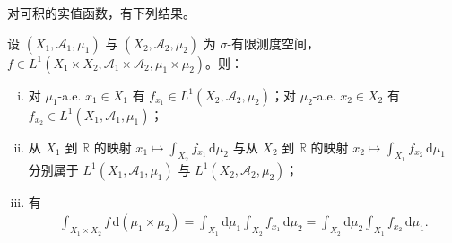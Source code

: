 \documentclass[../../main.tex]{subfiles}%
\begin{document}
对可积的实值函数，有下列结果。

\begin{theorem}[Fubini]\label{theorem:ch02-Fubini}
设 $(X_1,\mathscr A_1,\mu_1)$ 与 $(X_2,\mathscr A_2,\mu_2)$ 为 $\sigma$-有限测度空间，$f\in L^1(X_1\times X_2,\mathscr A_1\times\mathscr A_2,\mu_1\times\mu_2)$。则：
\begin{enumerate}[(i)]
\item 对 $\mu_1$-a.e. $x_1\in X_1$ 有 $f_{x_1}\in L^1(X_2,\mathscr A_2,\mu_2)$；对 $\mu_2$-a.e. $x_2\in X_2$ 有 $f_{x_2}\in L^1(X_1,\mathscr A_1,\mu_1)$；
\item 从 $X_1$ 到 $\mathbb R$ 的映射 $x_1\mapsto\int_{X_2}f_{x_1}\,\mathrm{d}\mu_2$ 与从 $X_2$ 到 $\mathbb R$ 的映射 $x_2\mapsto\int_{X_1}f_{x_2}\,\mathrm{d}\mu_1$ 分别属于 $L^1(X_1,\mathscr A_1,\mu_1)$ 与 $L^1(X_2,\mathscr A_2,\mu_2)$；
\item 有
\begin{align}
\int_{X_1\times X_2}f\,\mathrm{d}(\mu_1\times\mu_2)
=\int_{X_1}\mathrm{d}\mu_1\int_{X_2}f_{x_1}\,\mathrm{d}\mu_2
=\int_{X_2}\mathrm{d}\mu_2\int_{X_1}f_{x_2}\,\mathrm{d}\mu_1. \label{align:ch02-2.18}
\end{align}
\end{enumerate}
\end{theorem}
\end{document}
